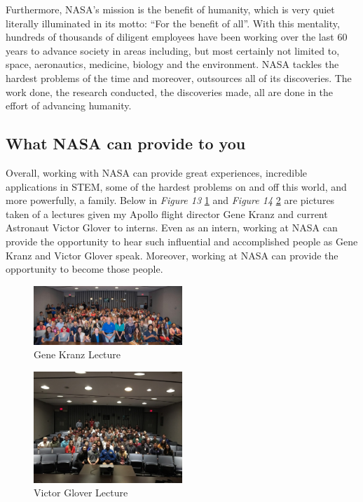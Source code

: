 \documentclass{article}
\let\Oldsubsection\subsection
\renewcommand{\subsection}{\FloatBarrier\Oldsubsection}
\begin{document}
Furthermore, NASA’s mission is the benefit of humanity, which is very 
quiet literally illuminated in its motto: “For the benefit of all”. With 
this mentality, hundreds of thousands of diligent employees have been 
working over the last 60 years to advance society in areas including, 
but most certainly not limited to, space, aeronautics, medicine, biology 
and the environment. NASA tackles the hardest problems of the time and 
moreover, outsources all of its discoveries. The work done, the research 
conducted, the discoveries made, all are done in the effort of advancing 
humanity.

\subsection{What NASA can provide to you}

Overall, working with NASA can provide great experiences, incredible 
applications in STEM, some of the hardest problems on and off this 
world, and more powerfully, a family. Below in \textit{Figure 13} 
\ref{fig:bigoutreachgroup} and \textit{Figure 14} 
\ref{fig:smalleroutreachgroup} are pictures taken of a lectures given my 
Apollo flight director Gene Kranz and current Astronaut Victor Glover to 
interns. Even as an intern, working at NASA can provide the opportunity 
to hear such influential and accomplished people as Gene Kranz and 
Victor Glover speak. Moreover, working at NASA can provide the 
opportunity to become those people.

\begin{figure}[!htb]
  \centering
  \includegraphics[width=0.5\textwidth]{assets/bigoutreachgroup.jpg}
  \caption{Gene Kranz Lecture}
  \label{fig:bigoutreachgroup}
\end{figure}

\begin{figure}[!htb]
  \centering
  \includegraphics[width=0.5\textwidth]{assets/smalleroutreachgroup.png}
  \caption{Victor Glover Lecture}
  \label{fig:smalleroutreachgroup}
\end{figure}
\end{document}
